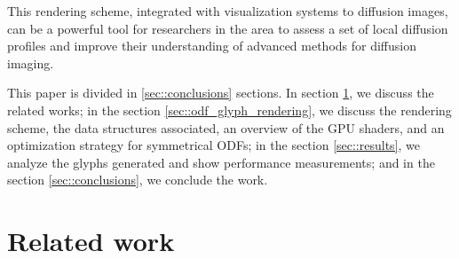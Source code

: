 \documentclass[twoside,twocolumn,10pt]{article}
\begin{document}
This rendering scheme, integrated with visualization systems to diffusion images, can be a powerful tool for researchers in the area to assess a set of local diffusion profiles and improve their understanding of advanced methods for diffusion imaging.

This paper is divided in \ref{sec::conclusions} sections. In section \ref{sec::related_work}, we discuss the related works; in the section \ref{sec::odf_glyph_rendering}, we discuss the rendering scheme, the data structures associated, an overview of the GPU shaders, and an optimization strategy for symmetrical ODFs; in the section \ref{sec::results}, we analyze the glyphs generated and show performance measurements; and in the section \ref{sec::conclusions}, we conclude the work.








\section{Related work}
\label{sec::related_work}




\end{document}
